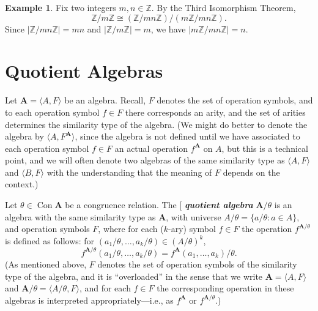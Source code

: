 \documentclass[12pt]{article}
\theoremstyle{plain}
\theoremstyle{definition}
\newtheorem{example}[theorem]{Example}
\theoremstyle{remark}
\theoremstyle{remark}
\numberwithin{theorem}{section}
\numberwithin{equation}{section}
\newcommand{\<}{\ensuremath{\langle}}
\renewcommand{\>}{\ensuremath{\rangle}}
\newcommand{\Con}{\ensuremath{\operatorname{Con}}}
\newcommand{\bA}{\ensuremath{\mathbf{A}}}
\newcommand{\Z}{\ensuremath{\mathbb{Z}}}   %
\newcommand{\indexit}[1]{\index{#1|textit}}
\def\defn#1{\gdef\defnstring{#1}%
  \xdef\dodefnii{{\noexpand\bfseries\noexpand\em
       \defnstring}\noexpand\indexit{\defnstring}\noexpand\makeatother}%
  \futurelet\nextthing\dodefn}
\def\dodefn{%
  \ifx\nextthing[\let\next=\dodefni
    \else\let\next=\dodefnii\fi
  \makeatletter
  \next}
\def\dodefni[#1]{%
  {\bfseries\em\defnstring}%
  \indexit{#1}%
  \makeatother}
\begin{document}
 
  \begin{example}
    Fix two integers $m, n \in \Z$.  By the Third Isomorphism Theorem,
    \[
      {\mathbb Z} / m {\mathbb Z} \cong ({\mathbb Z}/ mn {\mathbb Z})/ (m {\mathbb Z}/ mn
      {\mathbb Z}). 
      \]
      Since $| {\mathbb Z} / mn {\mathbb Z} | = mn$ and  
      $|{\mathbb Z} / m{\mathbb Z}| = m$, 
      we have $| m {\mathbb Z} / mn {\mathbb Z}| = n$. 
  \end{example}
 


\section{Quotient Algebras}
Let $\bA = \<A, F\>$ be an algebra.  Recall, $F$ denotes the set of operation symbols,
and to each operation symbol $f\in F$ there corresponds an arity, and the set of
arities determines the similarity type of the algebra.  (We might do better to
denote the algebra by $\<A, F^\bA\>$, since the algebra is not defined 
until we have associated to each operation symbol $f\in F$ an actual operation
$f^\bA$ on $A$, but this is a technical point, and we will often denote two
algebras of the same similarity type as $\<A, F\>$ and $\<B, F\>$ with the
understanding that the meaning of $F$ depends on the context.)

Let $\theta \in \Con\bA$ be a congruence relation.  The \defn{quotient algebra}
$\bA/\theta$ is an algebra with the same similarity type as $\bA$, with universe
$A/\theta = \{a/\theta : a\in A\}$, and operation symbols $F$, where for each
($k$-ary) symbol $f\in F$  the operation $f^{\bA/\theta}$ is defined as follows:
for $(a_1/\theta, \dots, a_k/\theta) \in (A/\theta)^k$, 
\[
f^{\bA/\theta}(a_1/\theta, \dots, a_k/\theta) = 
f^{\bA}(a_1,\dots, a_k)/\theta. %
\]
(As mentioned above, $F$ denotes the set of operation symbols of the
similarity type of the algebra, and it is ``overloaded''  in the sense that we
write $\bA = \<A, F\>$ and $\bA/\theta = \<A/\theta, F\>$, and for each
$f\in F$ the corresponding operation in these algebras is interpreted
appropriately---i.e., as $f^\bA$ or $f^{\bA/\theta}$.) 
\end{document}
